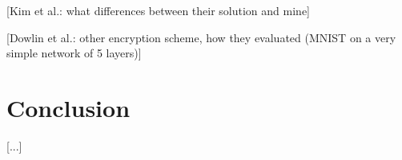 \documentclass[a4paper,11pt,oneside]{report}
\begin{document}
[Kim et al.: what differences between their solution and mine]

[Dowlin et al.: other encryption scheme, how they evaluated (MNIST on a very simple network of 5 layers)]


\chapter{Conclusion}


[...]

\cleardoublepage
{}
{}
\printbibliography
\end{document}
